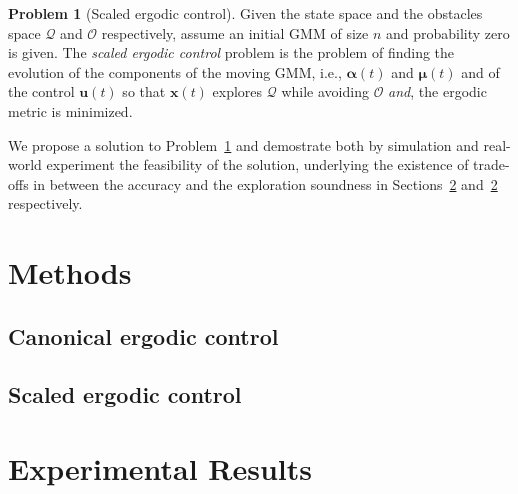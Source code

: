 \documentclass[letterpaper,10pt,conference,twoside]{IEEEtran}
\theoremstyle{definition}
\newtheorem{pb}{Problem}[section]
\begin{document}
\begin{pb}[Scaled ergodic control]\label{pb}
  Given the state space and the obstacles space $\mathcal{Q}$ and $\mathcal{O}$ respectively, assume an initial GMM of size $n$ and probability zero is given. The \textit{scaled ergodic control} problem is the problem of finding the evolution of the components of the moving GMM, i.e., $\boldsymbol{\alpha}(t)$ and $\boldsymbol{\mu}(t)$ and of the control $\mathbf{u}(t)$ so that $\mathbf{x}(t)$ explores $\mathcal{Q}$ while avoiding $\mathcal{O}$ \textit{and}, the ergodic metric is minimized.
\end{pb}

We propose a solution to Problem~\ref{pb} and demostrate both by simulation and real-world experiment the feasibility of the solution, underlying the existence of trade-offs in between the accuracy and the exploration soundness in Sections~\ref{sec:res} and~\ref{sec:res} respectively.

\section{Methods}\label{sec:meth}
\noindent

\subsection{Canonical ergodic control}

\subsection{Scaled ergodic control}
\label{sec:sol}


\section{Experimental Results}\label{sec:res}
\noindent

~ 
\newpage

~
\newpage
\end{document}
